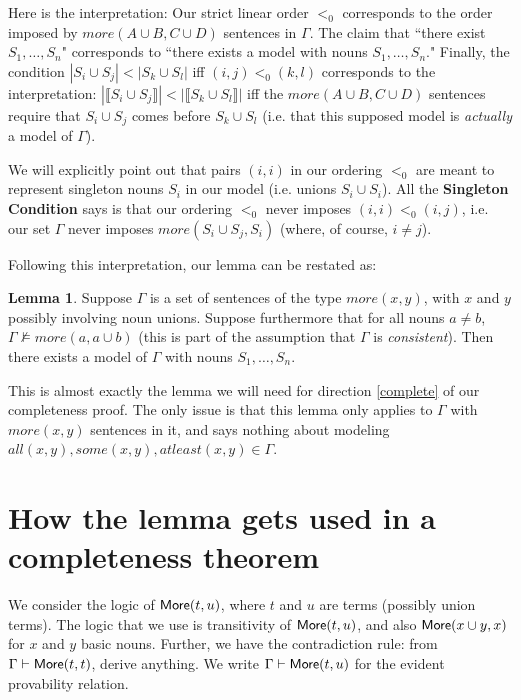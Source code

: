 \documentclass[12pt]{article}
\newcommand{\more}{\mbox{\sf More}}
\theoremstyle{definition}
\newtheorem{lemma}[theorem]{Lemma}
\newcommand{\proves}{\vdash}
\begin{document}
Here is the interpretation: Our strict linear order $<_0$ corresponds to the order imposed by $more(A \cup B, C \cup D)$ sentences in $\Gamma$.  The claim that ``there exist $S_1, \ldots, S_n$" corresponds to ``there exists a model with nouns $S_1, \ldots, S_n$."  Finally, the condition $|S_i \cup S_j| < |S_k \cup S_l|$ iff $(i, j) <_0 (k, l)$ corresponds to the interpretation: $|\llbracket S_i \cup S_j \rrbracket| < |\llbracket S_k \cup S_l \rrbracket|$ iff the $more(A \cup B, C \cup D)$ sentences require that $S_i \cup S_j$ comes before $S_k \cup S_l$ (i.e. that this supposed
model is \textit{actually} a model of $\Gamma$).

We will explicitly point out that pairs $(i, i)$ in our ordering $<_0$ are meant to represent singleton nouns $S_i$ in our model (i.e. unions $S_i \cup S_i$).  All the \textbf{Singleton Condition} says is that our ordering $<_0$ never imposes $(i, i) <_0 (i, j)$, i.e. our set $\Gamma$ never imposes $more(S_i \cup S_j, S_i)$ (where, of course, $i \ne j$).

Following this interpretation, our lemma can be restated as:

\begin{lemma}\label{Reinterpreted-Comb-Lemma}
    Suppose $\Gamma$ is a set of sentences of the type $more(x, y)$,
    with $x$ and $y$ possibly involving noun unions.
    Suppose furthermore that for all nouns $a \ne b$, 
    $\Gamma \nvDash more(a, a \cup b)$ (this is part of the assumption
    that $\Gamma$ is \textit{consistent}).  Then there exists a model
    of $\Gamma$ with nouns $S_1, \ldots, S_n$.
\end{lemma}

This is almost exactly the lemma we will need for direction 
\ref{complete} of our completeness proof.  The only issue is that this
lemma only applies to $\Gamma$ with $more(x, y)$ sentences in it, and
says nothing about modeling $all(x, y), some(x, y), atleast(x, y) \in \Gamma$.

\section{How the lemma gets used in a completeness theorem}

We consider the logic of $\more(t,u)$, where $t$ and $u$ are terms (possibly union terms).
The logic that we use is transitivity of $\more(t,u)$, and also $\more(x\cup y, x)$ for $x$ and $y$
basic nouns.  Further, we have the contradiction rule:
from $\Gamma\proves\more(t,t)$, derive anything.
We write $\Gamma\proves\more(t,u)$
for the evident provability relation.  
\end{document}
